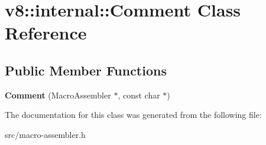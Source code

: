 \hypertarget{classv8_1_1internal_1_1_comment}{}\section{v8\+:\+:internal\+:\+:Comment Class Reference}
\label{classv8_1_1internal_1_1_comment}
\subsection*{Public Member Functions}
\begin{DoxyCompactItemize}
\item 
\hypertarget{classv8_1_1internal_1_1_comment_a16a065506583a049cfa0203da42d268e}{}{\bfseries Comment} (Macro\+Assembler $\ast$, const char $\ast$)\label{classv8_1_1internal_1_1_comment_a16a065506583a049cfa0203da42d268e}

\end{DoxyCompactItemize}


The documentation for this class was generated from the following file\+:\begin{DoxyCompactItemize}
\item 
src/macro-\/assembler.\+h\end{DoxyCompactItemize}
